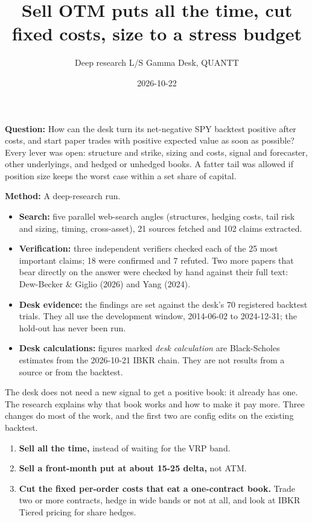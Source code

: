 \documentclass{article}
\title{Sell OTM puts all the time, cut fixed costs, size to a stress budget}
\author{Deep research \textperiodcentered{} L/S Gamma Desk, QUANTT}
\date{2026-10-22}
\begin{document}
\maketitle

\textbf{Question:} How can the desk turn its net-negative SPY backtest positive after costs, and start paper trades with positive expected value as soon as possible? Every lever was open: structure and strike, sizing and costs, signal and forecaster, other underlyings, and hedged or unhedged books. A fatter tail was allowed if position size keeps the worst case within a set share of capital.

\textbf{Method:} A deep-research run.

\begin{itemize}

\item \textbf{Search:} five parallel web-search angles (structures, hedging costs, tail risk and sizing, timing, cross-asset), 21 sources fetched and 102 claims extracted.

\item \textbf{Verification:} three independent verifiers checked each of the 25 most important claims; 18 were confirmed and 7 refuted. Two more papers that bear directly on the answer were checked by hand against their full text: Dew-Becker \& Giglio (2026) and Yang (2024).

\item \textbf{Desk evidence:} the findings are set against the desk's 70 registered backtest trials. They all use the development window, 2014-06-02 to 2024-12-31; the hold-out has never been run.

\item \textbf{Desk calculations:} figures marked \emph{desk calculation} are Black-Scholes estimates from the 2026-10-21 IBKR chain. They are not results from a source or from the backtest.

\end{itemize}

The desk does not need a new signal to get a positive book: it already has one. The research explains why that book works and how to make it pay more. Three changes do most of the work, and the first two are config edits on the existing backtest.

\begin{enumerate}

\item \textbf{Sell all the time,} instead of waiting for the VRP band.

\item \textbf{Sell a front-month put at about 15-25 delta,} not ATM.

\item \textbf{Cut the fixed per-order costs that eat a one-contract book.} Trade two or more contracts, hedge in wide bands or not at all, and look at IBKR Tiered pricing for share hedges.

\end{enumerate}
\end{document}
